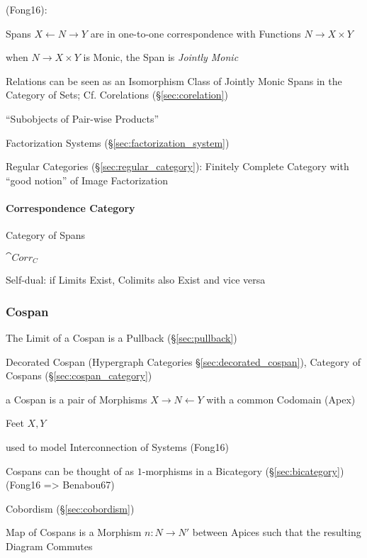 (Fong16):

Spans $X \leftarrow N \rightarrow Y$ are in one-to-one correspondence
with Functions $N \rightarrow X \times Y$

when $N \rightarrow X \times Y$ is Monic, the Span is \emph{Jointly
  Monic}

Relations can be seen as an Isomorphism Class of Jointly Monic Spans
in the Category of Sets; \fist Cf. Corelations
(\S\ref{sec:corelation})

``Subobjects of Pair-wise Products'' %

Factorization Systems (\S\ref{sec:factorization_system}) %

\fist Regular Categories (\S\ref{sec:regular_category}): Finitely
Complete Category with ``good notion'' of Image Factorization



\paragraph{Correspondence Category}\label{sec:correspondence_category}\hfill

Category of Spans

$\cat{Corr_C}$

Self-dual: if Limits Exist, Colimits also Exist and vice versa



\subsubsection{Cospan}\label{sec:cospan}

The Limit of a Cospan is a Pullback (\S\ref{sec:pullback})

\fist Decorated Cospan (Hypergraph Categories
\S\ref{sec:decorated_cospan}), Category of Cospans
(\S\ref{sec:cospan_category})

a Cospan is a pair of Morphisms $X \rightarrow N \leftarrow Y$ with a
common Codomain (Apex)

Feet $X,Y$

used to model Interconnection of Systems (Fong16)

Cospans can be thought of as $1$-morphisms in a Bicategory
(\S\ref{sec:bicategory}) (Fong16 => Benabou67)

Cobordism (\S\ref{sec:cobordism})

Map of Cospans is a Morphism $n : N \rightarrow N'$ between Apices
such that the resulting Diagram Commutes

